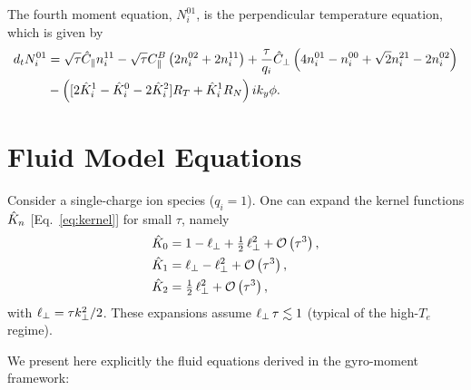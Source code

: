 \documentclass{article}
\begin{document}
The fourth moment equation, $N_i^{01}$, is the perpendicular temperature equation, which is given by
\begin{align}
\label{eq:moment_3}
d_t N_i^{01} &= \sqrt{\tau} \hat{C}_{\parallel} n_i^{11} 
    - \sqrt{\tau} C^B_{\parallel} \left( 2n_i^{02} + 2 n_i^{11} \right)
    + \frac{\tau}{q_i} \hat{C}_{\perp} \left( 4 n_i^{01} - n_i^{00} + \sqrt{2} n_i^{21} - 2 n_i^{02} \right) \nonumber \\
    &- \left([2\hat K_i^1 - \hat K_i^0 - 2\hat K_i^2]R_T + \hat K_i^1 R_N \right) i k_y \phi.
\end{align}

\section{Fluid Model Equations}

Consider a single-charge ion species ($q_i=1$). One can expand the kernel functions $\hat K_n$ [Eq.~\eqref{eq:kernel}] for small $\tau$, namely
\begin{align}
    \hat K_0  &=  1  - \ell_\perp
                  + \tfrac12\,\ell_\perp^2 + \mathcal O\left(\tau^3\right),\\
    \hat K_1  &=  \ell_\perp
                  - \ell_\perp^2
                  + \mathcal O\left(\tau^3\right),\\    
    \hat K_2  &=  \tfrac12\,\ell_\perp^2  + \mathcal O\left(\tau^3\right),
\end{align}
with $\ell_\perp = \tau k_\perp^2/2$.
These expansions assume $\ell_\perp\,\tau \lesssim 1$ (typical of the high-$T_e$ regime).  

We present here explicitly the fluid equations derived in the gyro-moment framework:
\end{document}
